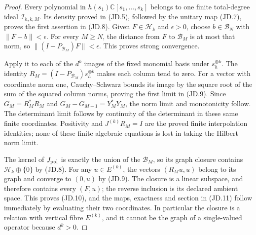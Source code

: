 \begin{proof}
Every polynomial in \(h(s_1)\mathbb C[s_1,\ldots,s_k]\)
belongs to one finite total-degree ideal \(\mathcal I_{h,k,M}\).
Its density proved in (JD.5), followed by the unitary map (JD.7),
proves the first assertion in (JD.8).  Given \(F\in\mathcal H_k\)
and \(\epsilon>0\), choose \(b\in\mathcal B_N\) with
\(\|F-b\|<\epsilon\).  For every \(M\ge N\), the distance
from \(F\) to \(\mathcal B_M\) is at most that norm, so
\(\|(I-P_{\mathcal B_M})F\|<\epsilon\).  This proves strong
convergence.

Apply it to each of the \(d^k\) images of the fixed monomial
basis under \(s_h^{\otimes k}\).  The identity
\(R_M=(I-P_{\mathcal B_M})s_h^{\otimes k}\) makes each
column tend to zero.  For a vector with coordinate norm one,
Cauchy--Schwarz bounds its image by the square root of the sum of
the squared column norms, proving the first limit in (JD.9).
Since \(G_M=R_M^*R_M\) and
\(G_M-G_{M+1}=Y_M^*Y_M\), the norm limit and monotonicity
follow.  The determinant limit follows by continuity of the
determinant in these same finite coordinates.  Positivity and
\(J^{(k)}R_M=I\) are the proved finite interpolation identities;
none of these finite algebraic equations is lost in taking the
Hilbert norm limit.

The kernel of \(J_{\rm pol}\) is exactly the union of the
\(\mathcal B_M\), so its graph closure contains
\(\mathcal H_k\oplus\{0\}\) by (JD.8).  For any
\(u\in E^{(k)}\), the vectors \((R_Mu,u)\) belong to its
graph and converge to \((0,u)\) by (JD.9).  The closure is a
linear subspace, and therefore contains every \((F,u)\); the
reverse inclusion is its declared ambient space.  This proves
(JD.10), and the maps, exactness and section in (JD.11) follow
immediately by evaluating their two coordinates.  In particular
the closure is a relation with vertical fibre \(E^{(k)}\),
and it cannot be the graph of a single-valued operator because
\(d^k>0\).
\end{proof}

